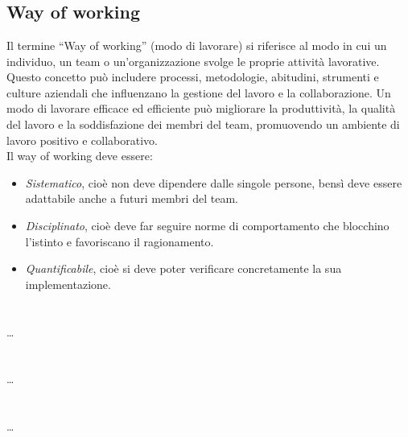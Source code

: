 
\section{}

\hypertarget{sec:way_of_working}{}
\subsection*{Way of working}
Il termine “Way of working” (modo di lavorare) si riferisce al modo in cui un individuo, un team o un’organizzazione svolge le proprie attività lavorative. 
Questo concetto può includere processi, metodologie, abitudini, strumenti e culture aziendali che influenzano la gestione del lavoro e la collaborazione. 
Un modo di lavorare efficace ed efficiente può migliorare la produttività, la qualità del lavoro e la soddisfazione dei membri del team, promuovendo un 
ambiente di lavoro positivo e collaborativo. \\
Il way of working deve essere:
\begin{itemize}
    \item \emph{Sistematico}, cioè non deve dipendere dalle singole persone, bensì deve essere adattabile anche a futuri membri del team.
    \item \emph{Disciplinato}, cioè deve far seguire norme di comportamento che blocchino l'istinto e favoriscano il ragionamento.
    \item \emph{Quantificabile}, cioè si deve poter verificare concretamente la sua implementazione.
\end{itemize}

\newpage



\section{}

\dots

\newpage



\section{}

\dots

\newpage



\section{}

\dots

